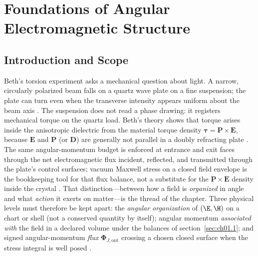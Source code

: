 ﻿\chapter{Foundations of Angular Electromagnetic Structure}
\label{ch:01}
\setcounter{section}{-1}


\section{Introduction and Scope}
\label{sec:ch01.0}

Beth's torsion experiment asks a mechanical question about light. A narrow, circularly polarized beam falls on a quartz wave plate on a fine suspension; the plate can turn even when the transverse intensity appears uniform about the beam axis \cite{beth1936}. The suspension does not read a phase drawing: it registers mechanical torque on the quartz load. Beth's theory shows that torque arises inside the anisotropic dielectric from the material torque density $\boldsymbol\tau=\mathbf P\times\mathbf E$, because $\mathbf E$ and $\mathbf P$ (or $\mathbf D$) are generally not parallel in a doubly refracting plate \cite{beth1936}. The same angular-momentum budget is enforced at entrance and exit faces through the net electromagnetic flux incident, reflected, and transmitted through the plate's control surfaces; vacuum Maxwell stress on a closed field envelope is the bookkeeping tool for that flux balance, not a substitute for the $\mathbf P\times\mathbf E$ density inside the crystal \cite{beth1936,stratton1941}. That distinction---between how a field is \emph{organized} in angle and what \emph{action} it exerts on matter---is the thread of the chapter. Three physical levels must therefore be kept apart: the \emph{angular organization} of $(\E,\H)$ on a chart or shell (not a conserved quantity by itself); angular momentum \emph{associated with} the field in a declared volume under the balances of section~\ref{sec:ch01.1}; and signed angular-momentum \emph{flux} $\boldsymbol{\Phi}_{J,\mathrm{out}}$ crossing a chosen closed surface when the stress integral is well posed \cite{stratton1941,beth1936}.

